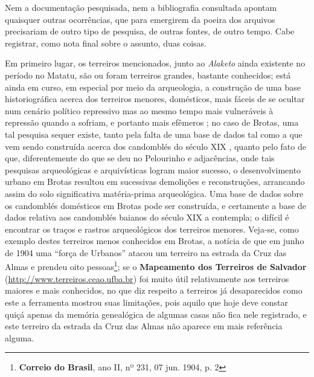 Nem a documentação pesquisada, nem a bibliografia consultada apontam quaisquer outras ocorrências, que para emergirem da poeira dos arquivos precisariam de outro tipo de pesquisa, de outras fontes, de outro tempo. Cabe registrar, como nota final sobre o assunto, duas coisas. 

Em primeiro lugar, os terreiros mencionados, junto ao \textit{Alaketo} ainda existente no período no Matatu, são ou foram terreiros grandes, bastante conhecidos; está ainda em curso, em especial por meio da arqueologia, a construção de uma base historiográfica acerca dos terreiros menores, domésticos, mais fáceis de se ocultar num cenário político repressivo mas ao mesmo tempo mais vulneráveis à repressão quando a sofriam, e portanto mais efêmeros \cite{gordenstein_arqueterre_2016}; no caso de Brotas, uma tal pesquisa sequer existe, tanto pela falta de uma base de dados tal como a que vem sendo construída acerca dos candomblés do século XIX \cite{reis_candomble_2001}, quanto pelo fato de que, diferentemente do que se deu no Pelourinho e adjacências, onde tais pesquisas arqueológicas e arquivísticas logram maior sucesso, o desenvolvimento urbano em Brotas resultou em sucessivas demolições e reconstruções, arrancando assim do solo significativa matéria-prima arqueológica. Uma base de dados sobre os candomblés domésticos em Brotas pode ser construída, e certamente a base de dados relativa aos candomblés baianos do século XIX a contempla; o difícil é encontrar os traços e rastros arqueológicos dos terreiros menores. Veja-se, como exemplo destes terreiros menos conhecidos em Brotas, a notícia de que em junho de 1904 uma ``força de Urbanos'' atacou um terreiro na estrada da Cruz das Almas e prendeu oito pessoas\footnote{\textbf{Correio do Brasil}, ano II, nº 231, 07 jun. 1904, p. 2}; se o \textbf{Mapeamento dos Terreiros de Salvador} (\url{http://www.terreiros.ceao.ufba.br}) foi muito útil relativamente aos terreiros maiores e mais conhecidos, no que diz respeito a terreiros já desaparecidos como este a ferramenta mostrou suas limitações, pois aquilo que hoje deve constar quiçá apenas da memória genealógica de algumas casas não fica nele registrado, e este terreiro da estrada da Cruz das Almas não aparece em mais referência alguma. 

